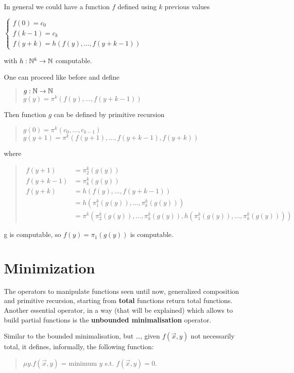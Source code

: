 \medskip

In general we could have a function $f$ defined using $k$ previous values

$\begin{cases}
  f(0) = c_0   \\
  f(k-1) = c_k \\
  f(y+k) = h(f(y),\dots,f(y+k-1))
\end{cases}$

with $h:\mathbb{N}^k\rightarrow\mathbb{N}$ computable.

One can proceed like before and define

\begin{quote}
  $g:\mathbb{N}\rightarrow\mathbb{N}$\\
  $g(y) = \pi^k(f(y),\dots,f(y+k-1))$
\end{quote}

Then function $g$ can be defined by primitive recursion

\begin{quote}
  $g(0) = \pi^k(c_0,\dots,c_{k-1})$\\
  $g(y+1) = \pi^k(f(y+1),\dots,f(y+k-1),f(y+k))$
\end{quote}
where
\begin{quote}
  $\begin{array}{ll}
     f(y+1) & = \pi_2^k(g(y))\\
     f(y+k-1) & = \pi_k^k(g(y))\\
     f(y+k) & = h(f(y),\dots,f(y+k-1)) \\
            & = h(\pi_1^k(g(y)),\dots,\pi_k^k(g(y)))\\
            & = \pi^k(\pi_2^k(g(y)),\dots,\pi_k^k(g(y)),h(\pi_1^k(g(y)),\dots,\pi_k^k(g(y))))
   \end{array}
   $
 \end{quote}

 g is computable, so $f(y) = \pi_1(g(y))$ is computable.

\section{Minimization}
The operators to manipulate functions seen until now, generalized composition and primitive recursion, starting from \textbf{total} functions return total functions. Another essential operator, in a way (that will be explained) which allows to build partial functions is the \textbf{unbounded minimalisation} operator.

Similar to the bounded minimalisation, but \dots, given $f(\vec{x},y)$ not necessarily total, it defines, informally, the following function:
\begin{quote}
  $\mu y . f(\vec{x},y) $ = minimum $y$ s.t. $f(\vec{x},y) = 0$.
\end{quote}

